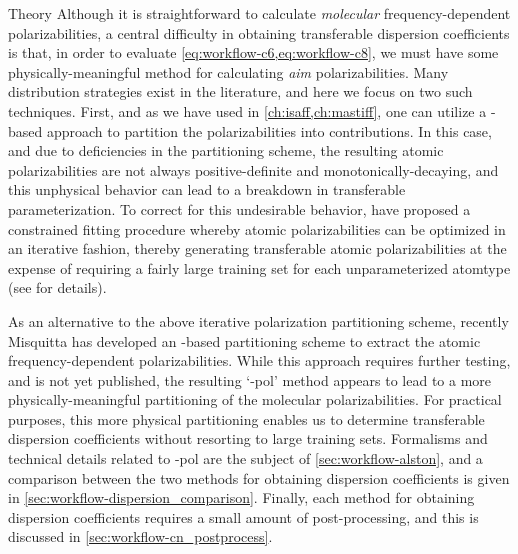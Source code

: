 \begin{subsubsection}{Theory}
Although it is straightforward to calculate \emph{molecular} frequency-dependent
polarizabilities, a central difficulty in obtaining transferable dispersion
coefficients is that, 
in order to evaluate \cref{eq:workflow-c6,eq:workflow-c8},
we must have some physically-meaningful method for
calculating \emph{\acrlong{aim}} polarizabilities.
Many
distribution strategies exist in the literature, and here we focus on two such
techniques. First, and as we have used in \cref{ch:isaff,ch:mastiff}, one can
utilize a
\dma-based approach to partition the polarizabilities into \aim
contributions. In this case, and due to deficiencies in the \dma partitioning
scheme,
the resulting atomic polarizabilities are not always 
positive-definite and monotonically-decaying, and this unphysical behavior can lead to a breakdown in
transferable parameterization.\cite{Williams2003}
To correct for this undesirable behavior, \citeauthor{McDaniel2013} have
proposed a constrained
fitting procedure whereby atomic polarizabilities can be optimized in an
iterative fashion, thereby generating transferable atomic polarizabilities at
the expense of requiring a fairly large training set for each unparameterized atomtype
(see  for details).

As an alternative to the above iterative polarization partitioning scheme, recently
Misquitta has developed an \isa-based partitioning scheme to extract the
atomic frequency-dependent polarizabilities. While this approach requires
further testing, and is not yet published,
the resulting `\isa-pol' method appears to lead to a more
physically-meaningful partitioning of the molecular polarizabilities. For
practical purposes, this more physical partitioning 
enables us to determine transferable dispersion coefficients without
resorting to large training sets. Formalisms and technical details
related to \isa-pol are the subject of \cref{sec:workflow-alston}, and a
comparison between the two methods for obtaining dispersion coefficients is
given in \cref{sec:workflow-dispersion_comparison}. Finally, each method for
obtaining dispersion coefficients requires a small amount of post-processing,
and this is discussed in \cref{sec:workflow-cn_postprocess}.

\end{subsubsection}

